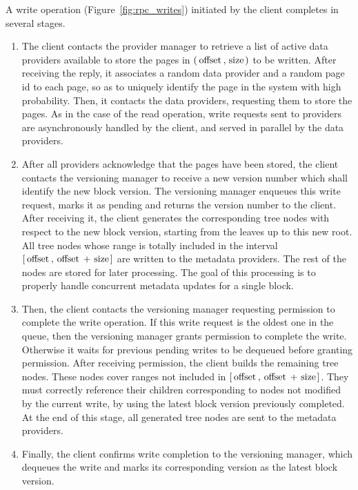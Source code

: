 \documentclass{llncs}
\newcommand{\myblock}[1]{\mbox{\lstinline{#1}}}
\newcommand{\myblockxspace}[1]{\myblock{#1}\xspace}
\newcommand{\Offset}{\myblockxspace{offset}}
\newcommand{\Size}{\myblockxspace{size}}
\begin{document}
A write operation (Figure~\ref{fig:rpc_writes}) initiated by the client completes in
several stages.
\begin{enumerate}
\item
The client contacts the provider manager to retrieve a list of active data
providers available to store the pages in $(\Offset, \Size)$ to be
written. 
After receiving the reply, it associates a random data
provider and a random page id to each page, so as to uniquely 
identify the page in the
system with high probability. Then, it contacts the data providers,
requesting them to store the pages. 
As in the case of the read operation, write
requests sent to providers are asynchronously handled by the client,
and served in parallel by the data providers.

\item
After all providers acknowledge that the pages have been stored, 
the client contacts the versioning manager to
receive a new version number which shall identify the new block version. The
versioning manager enqueues this write request, marks it as pending
and returns the version number to the client. After receiving it,
the client generates the corresponding tree nodes with respect to the
new block version, starting from the leaves up to this new root.  All
tree nodes whose range is totally included in the interval $[\Offset,
\Offset + \Size]$ are written to the metadata providers. The rest of the
nodes are stored for later processing. The goal of this processing is
to properly handle concurrent metadata updates for a single block.

\item 
Then, the client contacts the versioning
manager requesting permission to complete the write operation. If this
write request is the oldest one in the queue, then the versioning manager
grants permission to complete the write. Otherwise it waits
for previous pending writes to be dequeued before granting
permission. After receiving permission, the client builds the
remaining tree nodes. These nodes cover ranges not included in
$[\Offset, \Offset + \Size]$. They must correctly reference their children
corresponding to nodes not modified by the current write, by using the
latest block version previously completed. At the end of this stage,
all generated tree nodes are sent to the metadata providers.

\item
Finally, the client confirms write completion to the versioning
manager, which dequeues the write and marks its corresponding version
as the latest block version.

\end{enumerate}
\end{document}
